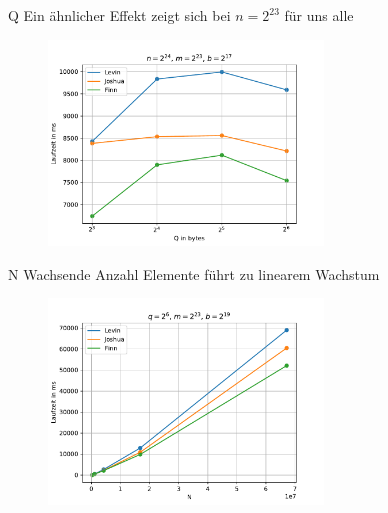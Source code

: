 \documentclass[ngerman,aspectratio=169,10pt]{beamer}
\begin{document}
\begin{frame}{Q}
Ein ähnlicher Effekt zeigt sich bei $n=2^{23}$ für uns alle
\begin{figure}[H]
    \centering
    \includegraphics[width=0.65\textwidth]{q__n_16777216_m_8388608_b_131072.pdf}
    \label{fig:f5}
\end{figure}
\end{frame}

\begin{frame}{N}
Wachsende Anzahl Elemente führt zu linearem Wachstum
\begin{figure}[H]
    \centering
    \includegraphics[width=0.65\textwidth]{Figure_3.pdf}
    \label{fig:f2}
\end{figure}
\end{frame}
\end{document}
